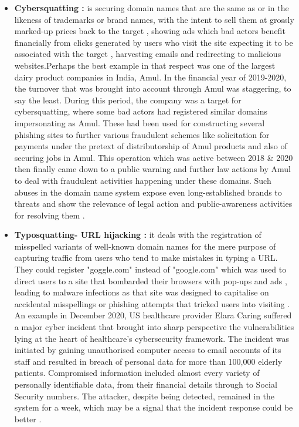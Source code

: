 \begin{itemize}
    \item \textbf{Cybersquatting :} is securing domain names that are the same as or in the likeness of trademarks or brand names, with the intent to sell them at grossly marked-up prices back to the target , showing ads which bad actors benefit financially from clicks generated by users who visit the site expecting it to be associated with the target , harvesting emails and redirecting to malicious websites.Perhaps the best example in that respect was one of the largest dairy product companies in India, Amul. In the financial year of 2019-2020, the turnover that was brought into account through Amul was staggering, to say the least. During this period, the company was a target for cybersquatting, where some bad actors had registered similar domains impersonating as Amul. These had been used for constructing several phishing sites to further various fraudulent schemes like solicitation for payments under the pretext of distributorship of Amul products and also of securing jobs in Amul. This operation which was active between 2018 \& 2020 then finally came down to a public warning and further law actions by Amul to deal with fraudulent activities happening under these domains. Such abuses in the domain name system expose even long-established brands to threats and show the relevance of legal action and public-awareness activities for resolving them \cite{MehtaCybersquatting}.
    
    \item \textbf{Typosquatting- URL hijacking :} it deals with the registration of misspelled variants of well-known domain names for the mere purpose of capturing traffic from users who tend to make mistakes in typing a URL. They could register "goggle.com" instead of "google.com" which was used to direct users to a site that bombarded their browsers with pop-ups and ads , leading to malware infections as that site was designed to capitalise on accidental misspellings or phishing  attempts that tricked users into visiting \cite{SplunkTyposquatting}. An example in December 2020, US healthcare provider Elara Caring suffered a major cyber incident that brought into sharp perspective the vulnerabilities lying at the heart of healthcare's cybersecurity framework. The incident was initiated by gaining unauthorised computer access to email accounts of its staff and resulted in breach of personal data for more than 100,000 elderly patients. Compromised information included almost every variety of personally identifiable data, from their financial details through to Social Security numbers. The attacker, despite being detected, remained in the system for a week, which may be a signal that the incident response could be better \cite{PandaSecurityPhishing}.
    

\end{itemize}
